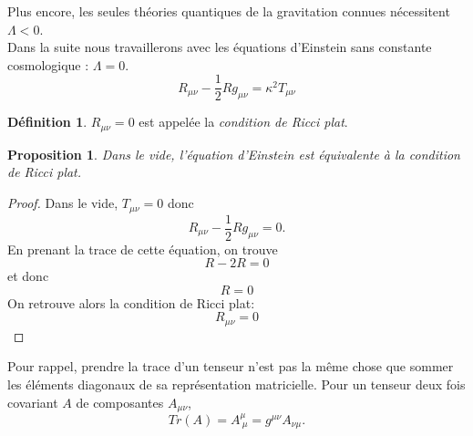 \documentclass[a4paper,11pt]{report}
\theoremstyle{definition}
\theoremstyle{plain}
\newtheorem{prop}[thm]{Proposition}
\theoremstyle{definition}
\newtheorem{defn}{Définition}[chapter]
\theoremstyle{remark}
\begin{document}
            Plus encore, les seules théories quantiques de la gravitation connues nécessitent $\Lambda<0$.\\
            
            Dans la suite nous travaillerons avec les équations d'Einstein sans constante cosmologique : $\Lambda = 0$.
            \begin{equation}
                R_{\mu\nu}-\frac{1}{2}Rg_{\mu\nu} = \kappa^2 T_{\mu\nu}
            \end{equation}
            
            \begin{defn}
                $R_{\mu\nu} = 0$ est appelée la \textit{condition de Ricci plat}.
            \end{defn}
            
            \begin{prop}
                Dans le vide, l'équation d'Einstein est équivalente à la \textit{condition de Ricci plat}.
            \end{prop}
            
            \begin{proof}
                Dans le vide, $T_{\mu\nu}=0$ donc
                \begin{equation}
                    R_{\mu\nu}-\frac{1}{2}Rg_{\mu\nu} = 0.
                \end{equation}
                En prenant la trace de cette équation, on trouve
                \begin{equation}
                    R-2R = 0
                \end{equation}
                et donc
                \begin{equation}
                    R = 0
                \end{equation}
                On retrouve alors la condition de Ricci plat:
                \begin{equation}
                    R_{\mu\nu} = 0
                \end{equation}
            \end{proof}
            Pour rappel, prendre la trace d'un tenseur n'est pas la même chose que sommer les éléments diagonaux de sa représentation matricielle. Pour un tenseur deux fois covariant $A$ de composantes $A_{\mu\nu}$, 
            \begin{equation}
                Tr(A) = A^\mu_{~\mu} = g^{\mu\nu}A_{\nu\mu}.
            \end{equation}
            
\end{document}
